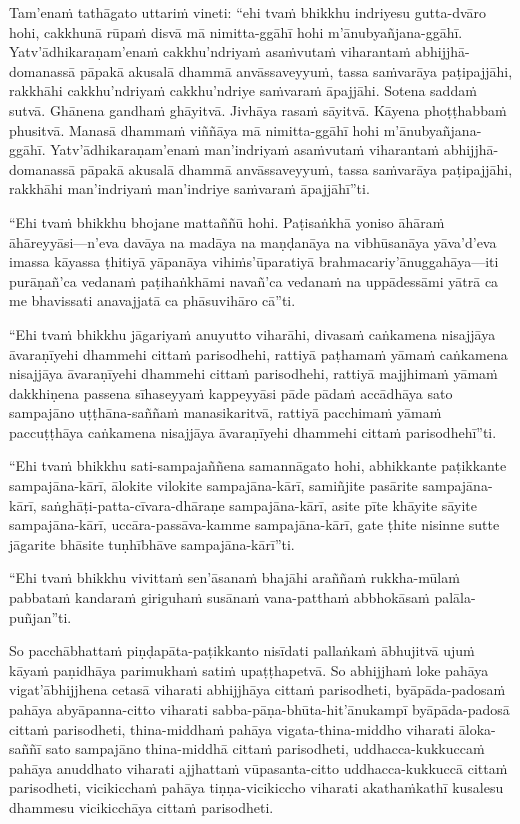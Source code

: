 \suttaRef{[MN 51]}

Tam'enaṁ tathāgato uttariṁ vineti: ``ehi tvaṁ bhikkhu indriyesu gutta-dvāro hohi, cakkhunā rūpaṁ disvā mā nimitta-ggāhī hohi m'ānubyañjana-ggāhī. Yatv'ādhikaraṇam'enaṁ cakkhu'ndriyaṁ asaṁvutaṁ viharantaṁ abhijjhā-domanassā pāpakā akusalā dhammā anvāssaveyyuṁ, tassa saṁvarāya paṭipajjāhi, rakkhāhi cakkhu'ndriyaṁ cakkhu'ndriye saṁvaraṁ āpajjāhi. Sotena saddaṁ sutvā. Ghānena gandhaṁ ghāyitvā. Jivhāya rasaṁ sāyitvā. Kāyena phoṭṭhabbaṁ phusitvā. Manasā dhammaṁ viññāya mā nimitta-ggāhī hohi m'ānubyañjana-ggāhī. Yatv'ādhikaraṇam'enaṁ man'indriyaṁ asaṁvutaṁ viharantaṁ abhijjhā-domanassā pāpakā akusalā dhammā anvāssaveyyuṁ, tassa saṁvarāya paṭipajjāhi, rakkhāhi man'indriyaṁ man'indriye saṁvaraṁ āpajjāhī''ti.

``Ehi tvaṁ bhikkhu bhojane mattaññū hohi. Paṭisaṅkhā yoniso āhāraṁ āhāreyyāsi—n'eva davāya na madāya na maṇḍanāya na vibhūsanāya yāva'd'eva imassa kāyassa ṭhitiyā yāpanāya vihiṁs'ūparatiyā brahmacariy'ānuggahāya—iti purāṇañ'ca vedanaṁ paṭihaṅkhāmi navañ'ca vedanaṁ na uppādessāmi yātrā ca me bhavissati anavajjatā ca phāsuvihāro cā''ti.

``Ehi tvaṁ bhikkhu jāgariyaṁ anuyutto viharāhi, divasaṁ caṅkamena nisajjāya āvaraṇīyehi dhammehi cittaṁ parisodhehi, rattiyā paṭhamaṁ yāmaṁ caṅkamena nisajjāya āvaraṇīyehi dhammehi cittaṁ parisodhehi, rattiyā majjhimaṁ yāmaṁ dakkhiṇena passena sīhaseyyaṁ kappeyyāsi pāde pādaṁ accādhāya sato sampajāno uṭṭhāna-saññaṁ manasikaritvā, rattiyā pacchimaṁ yāmaṁ paccuṭṭhāya caṅkamena nisajjāya āvaraṇīyehi dhammehi cittaṁ parisodhehī''ti.

``Ehi tvaṁ bhikkhu sati-sampajaññena samannāgato hohi, abhikkante paṭikkante sampajāna-kārī, ālokite vilokite sampajāna-kārī, samiñjite pasārite sampajāna-kārī, saṅghāṭi-patta-cīvara-dhāraṇe sampajāna-kārī, asite pīte khāyite sāyite sampajāna-kārī, uccāra-passāva-kamme sampajāna-kārī, gate ṭhite nisinne sutte jāgarite bhāsite tuṇhībhāve sampajāna-kārī''ti.

``Ehi tvaṁ bhikkhu vivittaṁ sen'āsanaṁ bhajāhi araññaṁ rukkha-mūlaṁ pabbataṁ kandaraṁ giriguhaṁ susānaṁ vana-patthaṁ abbhokāsaṁ palāla-puñjan''ti.

So pacchābhattaṁ piṇḍapāta-paṭikkanto nisīdati pallaṅkaṁ ābhujitvā ujuṁ kāyaṁ paṇidhāya parimukhaṁ satiṁ upaṭṭhapetvā. So abhijjhaṁ loke pahāya vigat'ābhijjhena cetasā viharati abhijjhāya cittaṁ parisodheti, byāpāda-padosaṁ pahāya abyāpanna-citto viharati sabba-pāṇa-bhūta-hit'ānukampī byāpāda-padosā cittaṁ parisodheti, thina-middhaṁ pahāya vigata-thina-middho viharati āloka-saññī sato sampajāno thina-middhā cittaṁ parisodheti, uddhacca-kukkuccaṁ pahāya anuddhato viharati ajjhattaṁ vūpasanta-citto uddhacca-kukkuccā cittaṁ parisodheti, vicikicchaṁ pahāya tiṇṇa-vicikiccho viharati akathaṁkathī kusalesu dhammesu vicikicchāya cittaṁ parisodheti.


